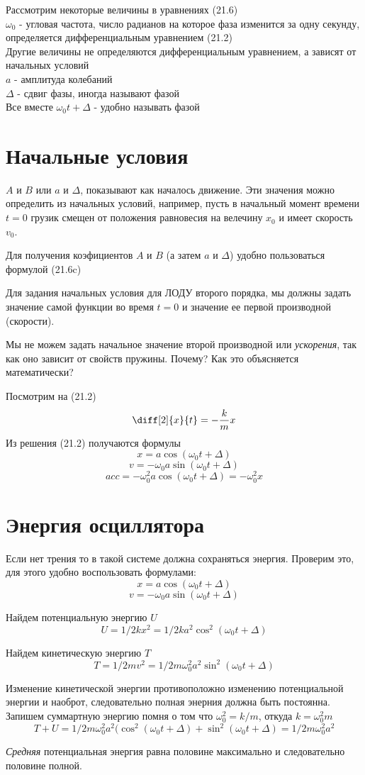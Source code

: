 \documentclass[12pt]{article}
\begin{document}
\medskip

Рассмотрим некоторые величины в уравнениях (21.6)
\\
$\omega_0$ - угловая частота, число радианов на которое фаза изменится за одну секунду, определяется дифференциальным уравнением (21.2)
\\
Другие величины не определяются дифференциальным уравнением, а зависят от начальных условий
\\
$a$ - амплитуда колебаний
\\
$\Delta$ - сдвиг фазы, иногда называют фазой
\\
Все вместе $\omega_0t+\Delta$ - удобно называть фазой

\section{Начальные условия}

$A$ и $B$ или $a$ и $\Delta$, показывают как началось движение. Эти значения можно определить из начальных условий, например, пусть в начальный момент времени $t=0$ грузик смещен от положения равновесия на велечину $x_0$ и имеет скорость  $v_0$.

Для получения коэфициентов $A$ и $B$ (а затем $a$ и $\Delta$) удобно пользоваться формулой (21.6c)

\newpage
Для задания начальных условия для ЛОДУ второго порядка, мы должны задать значение самой функции во время $t=0$ и значение ее первой производной (скорости).

Мы не можем задать начальное значение второй производной или \textit{ускорения}, так как оно зависит от свойств пружины. Почему? Как это объясняется математически?

Посмотрим на (21.2)
\[
\diff[2]{x}{t}=-\frac{k}{m}x
\]
Из решения (21.2) получаются формулы
\[
    x=a\cos(\omega_0t+\Delta)
\]
\[
    v=-\omega_0a\sin(\omega_0t+\Delta)
\]
\[
    acc=-\omega_0^2a\cos(\omega_0t+\Delta)=-\omega_0^2x
\]

\section{Энергия осциллятора}

Если нет трения то в такой системе должна сохраняться энергия. Проверим это, для этого удобно воспользовать формулами:
\[
    x=a\cos(\omega_0t+\Delta)
\]
\[
    v=-\omega_0a\sin(\omega_0t+\Delta)
\]

Найдем потенциальную энергию $U$
\[
    U = 1/2kx^2 = 1/2k a^2 \cos^2(\omega_0t+\Delta)
\]

Найдем кинетическую энергию $T$
\[
    T = 1/2mv^2 = 1/2 m \omega_0^2 a^2 \sin^2(\omega_0t+\Delta)
\]

Изменение кинетической энергии противоположно изменению потенциальной энергии и наоброт, следовательно полная энерния должна быть постоянна. Запишем суммартную энергию помня о том что $\omega_0^2=k/m$, откуда $k=\omega_0^2 m$
\[
    T+U = 1/2 m \omega_0^2 a^2 (\cos^2(\omega_0t+\Delta) + \sin^2(\omega_0t+\Delta) = 1/2 m \omega_0^2 a^2
\]

\textit{Средняя} потенциальная энергия равна половине максимально и следовательно половине полной.
\end{document}
